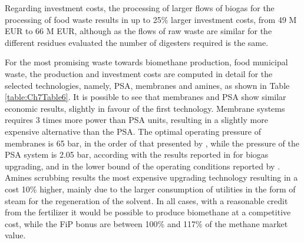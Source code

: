 \begin{refsection}[referencesCh7]
Regarding investment costs, the processing of larger flows of biogas for the processing of food waste results in up to 25\% larger investment costs, from 49 M EUR to 66 M EUR, although as the flows of raw
waste are similar for the different residues evaluated the number of digesters required is the same.

For the most promising waste towards biomethane production, food municipal waste, the production and investment costs are computed in detail for the selected technologies, namely, PSA, membranes and amines, as shown in Table \ref{table:Ch7Table6}. It is possible to see that membranes and PSA show similar economic results, slightly in favour of the first technology. Membrane systems requires 3 times more power than PSA units, resulting in a slightly more expensive alternative than the PSA. The optimal operating pressure of membranes is 65 bar, in the order of that presented by \citet{kim2017optimization}, while the pressure of the PSA system is 2.05 bar, according with the results reported in \citep{ferella2017separation} for biogas upgrading, and in the lower bound of the operating conditions reported by \citet{santos2011pressure}. Amines scrubbing results the most expensive upgrading technology resulting in a cost 10\% higher, mainly due to the larger consumption of utilities in the form of steam for the regeneration of the solvent. In all cases, with a reasonable credit from the fertilizer it would be possible to produce biomethane at a competitive cost, while the FiP bonus are between 100\% and 117\% of the methane market value.


\end{refsection}
